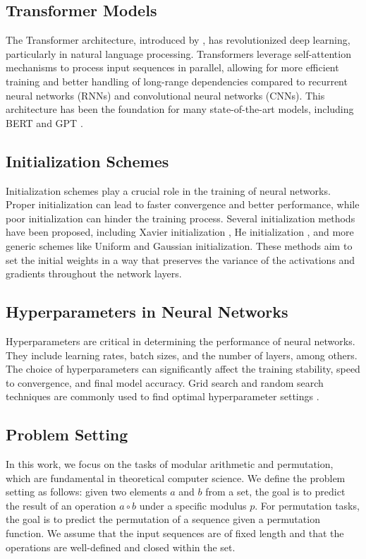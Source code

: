 \documentclass{article} %
\begin{document}
\subsection{Transformer Models}
The Transformer architecture, introduced by \citet{vaswani2017attention}, has revolutionized deep learning, particularly in natural language processing. Transformers leverage self-attention mechanisms to process input sequences in parallel, allowing for more efficient training and better handling of long-range dependencies compared to recurrent neural networks (RNNs) and convolutional neural networks (CNNs). This architecture has been the foundation for many state-of-the-art models, including BERT \citep{Devlin2019BERTPO} and GPT \citep{radford2019language}.

\subsection{Initialization Schemes}
Initialization schemes play a crucial role in the training of neural networks. Proper initialization can lead to faster convergence and better performance, while poor initialization can hinder the training process. Several initialization methods have been proposed, including Xavier initialization \citep{Glorot2010UnderstandingTD}, He initialization \citep{he2015delving}, and more generic schemes like Uniform and Gaussian initialization. These methods aim to set the initial weights in a way that preserves the variance of the activations and gradients throughout the network layers.

\subsection{Hyperparameters in Neural Networks}
Hyperparameters are critical in determining the performance of neural networks. They include learning rates, batch sizes, and the number of layers, among others. The choice of hyperparameters can significantly affect the training stability, speed to convergence, and final model accuracy. Grid search and random search techniques are commonly used to find optimal hyperparameter settings \citep{Bergstra2012RandomSF}.

\subsection{Problem Setting}
In this work, we focus on the tasks of modular arithmetic and permutation, which are fundamental in theoretical computer science. We define the problem setting as follows: given two elements \(a\) and \(b\) from a set, the goal is to predict the result of an operation \(a \circ b\) under a specific modulus \(p\). For permutation tasks, the goal is to predict the permutation of a sequence given a permutation function. We assume that the input sequences are of fixed length and that the operations are well-defined and closed within the set.
\end{document}
